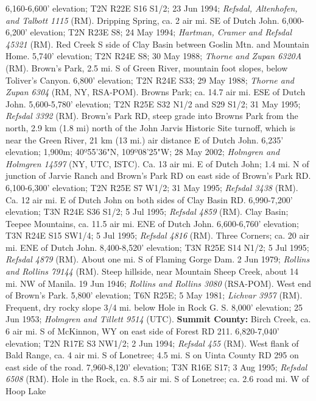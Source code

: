 6,160-6,600' elevation; T2N R22E S16 S1/2; 23 Jun 1994;
\textit{Refsdal, Altenhofen, and Talbott 1115} (RM).
Dripping Spring, ca. 2 air mi. SE of Dutch John. 6,000-6,200' elevation;
T2N R23E S8; 24 May 1994; \textit{Hartman, Cramer and Refsdal 45321} (RM).
Red Creek S side of Clay Basin between Goslin Mtn. and Mountain Home. 5,740'
elevation; T2N R24E S8; 30 May 1988; \textit{Thorne and Zupan 6320A} (RM).
Brown's Park, 2.5 mi. S of Green River, mountain foot slopes, below Toliver's
Canyon. 6,800' elevation; T2N R24E S33; 29 May 1988;
\textit{Thorne and Zupan 6304} (RM, NY, RSA-POM).
Browns Park; ca. 14.7 air mi. ESE of Dutch John. 5,600-5,780' elevation;
T2N R25E S32 N1/2 and S29 S1/2; 31 May 1995; \textit{Refsdal 3392} (RM).
Brown's Park RD, steep grade into Browns Park from the north, 2.9 km (1.8 mi)
north of the John Jarvis Historic Site turnoff, which is near the Green River,
21 km (13 mi.) air distance E of Dutch John. 6,235' elevation; 1,900m;
40º55'36"N, 109º08'25"W; 28 May 2002;
\textit{Holmgren and Holmgren 14597} (NY, UTC, ISTC).
Ca. 13 air mi. E of Dutch John; 1.4 mi. N of junction of Jarvie Ranch and
Brown's Park RD on east side of Brown's Park RD. 6,100-6,300' elevation;
T2N R25E S7 W1/2; 31 May 1995; \textit{Refsdal 3438} (RM).
Ca. 12 air mi. E of Dutch John on both sides of Clay Basin RD. 6,990-7,200'
elevation; T3N R24E S36 S1/2; 5 Jul 1995; \textit{Refsdal 4859} (RM).
Clay Basin; Teepee Mountains, ca. 11.5 air mi. ENE of Dutch John. 6,600-6,760'
elevation; T3N R24E S15 SW1/4; 5 Jul 1995; \textit{Refsdal 4816} (RM).
Three Corners; ca. 20 air mi. ENE of Dutch John. 8,400-8,520' elevation;
T3N R25E S14 N1/2; 5 Jul 1995; \textit{Refsdal 4879} (RM).
About one mi. S of Flaming Gorge Dam. 2 Jun 1979;
\textit{Rollins and Rollins 79144} (RM).
Steep hillside, near Mountain Sheep Creek, about 14 mi. NW of Manila.
19 Jun 1946; \textit{Rollins and Rollins 3080} (RSA-POM).
West end of Brown's Park. 5,800' elevation; T6N R25E; 5 May 1981;
\textit{Lichvar 3957} (RM).
Frequent, dry rocky slope 3/4 mi. below Hole in Rock G. S. 8,000' elevation;
25 Jun 1953; \textit{Holmgren and Tillett 9514} (UTC).
  \textbf{Summit County:}
Birch Creek, ca. 6 air mi. S of McKinnon, WY on east side of Forest RD 211.
6,820-7,040' elevation; T2N R17E S3 NW1/2; 2 Jun 1994; \textit{Refsdal 455} (RM).
West flank of Bald Range, ca. 4 air mi. S of Lonetree; 4.5 mi. S on Uinta County
RD 295 on east side of the road. 7,960-8,120' elevation; T3N R16E S17;
3 Aug 1995; \textit{Refsdal 6508} (RM).
Hole in the Rock, ca. 8.5 air mi. S of Lonetree; ca. 2.6 road mi. W of Hoop Lake
